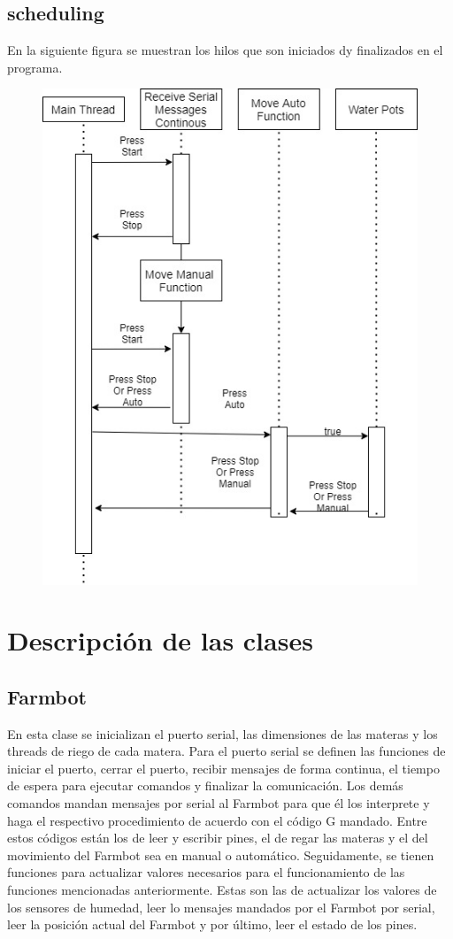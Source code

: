 \documentclass[letterpaper,12pt]{article}
\begin{document}
	\subsection{scheduling}
	En la siguiente figura se muestran los hilos que son iniciados dy finalizados en el programa.
	\begin{figure}[H]
		\centering
		\includegraphics[width=0.7\linewidth]{images/hilos_usuario}
		\label{fig:hilosusuario}
	\end{figure}
	


	
	

  

	\section{Descripción de las clases}
	\label{sec:descripcion}
	
	\subsection{Farmbot}
	En esta clase se inicializan el puerto serial, las dimensiones de las materas y los threads de riego de cada matera. Para el puerto serial se definen las funciones de iniciar el puerto, cerrar el puerto, recibir mensajes de forma continua, el tiempo de espera para ejecutar comandos y finalizar la comunicación. 
	Los demás comandos mandan mensajes por serial al Farmbot para que él los interprete y haga el respectivo procedimiento de acuerdo con el código G mandado. Entre estos códigos están los de leer y escribir pines, el de regar las materas y el del movimiento del Farmbot sea en manual o automático. Seguidamente, se tienen funciones para actualizar valores necesarios para el funcionamiento de las funciones mencionadas anteriormente. Estas son las de actualizar los valores de los sensores de humedad, leer lo mensajes mandados por el Farmbot por serial, leer la posición actual del Farmbot y por último, leer el estado de los pines.  
		
\end{document}
